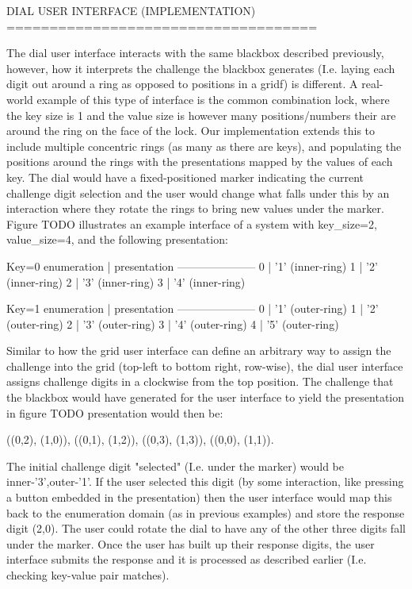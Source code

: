 \documentclass[12pt]{document}
\begin{document}
\begin{Introduction}
DIAL USER INTERFACE (IMPLEMENTATION)
====================================

The dial user interface interacts with the same blackbox described previously, however, how it interprets the challenge the blackbox generates (I.e. laying each digit out around a ring as opposed to positions in a gridf) is different.
A real-world example of this type of interface is the common combination lock, where the key size is 1 and the value size is however many positions/numbers their are around the ring on the face of the lock.
Our implementation extends this to include multiple concentric rings (as many as there are keys), and populating the positions around the rings with the presentations mapped by the values of each key.
The dial would have a fixed-positioned marker indicating the current challenge digit selection and the user would change what falls under this by an interaction where they rotate the rings to bring new values under the marker.
Figure TODO illustrates an example interface of a system with key_size=2, value_size=4, and the following presentation:

Key=0
  enumeration | presentation 
  ---------------------
  0 | '1' (inner-ring)
  1 | '2' (inner-ring)
  2 | '3' (inner-ring)
  3 | '4' (inner-ring)

Key=1 
  enumeration | presentation 
  ---------------------
  0 | '1' (outer-ring)
  1 | '2' (outer-ring)
  2 | '3' (outer-ring)
  3 | '4' (outer-ring)
  4 | '5' (outer-ring)


Similar to how the grid user interface can define an arbitrary way to assign the challenge into the grid (top-left to bottom right, row-wise), the dial user interface assigns challenge digits in a clockwise from the top position. The challenge that the blackbox would have generated for the user interface to yield the presentation in figure TODO presentation would then be:

  ((0,2), (1,0)), ((0,1), (1,2)),
  ((0,3), (1,3)), ((0,0), (1,1)).


The initial challenge digit "selected" (I.e. under the marker) would be inner-'3',outer-'1'. If the user selected this digit (by some interaction, like pressing a button embedded in the presentation) then the user interface would map this back to the enumeration domain (as in previous examples) and store the response digit (2,0).
The user could rotate the dial to have any of the other three digits fall under the marker.
Once the user has built up their response digits, the user interface submits the response and it is processed as described earlier (I.e. checking key-value pair matches).



\end{Introduction}
\end{document}
